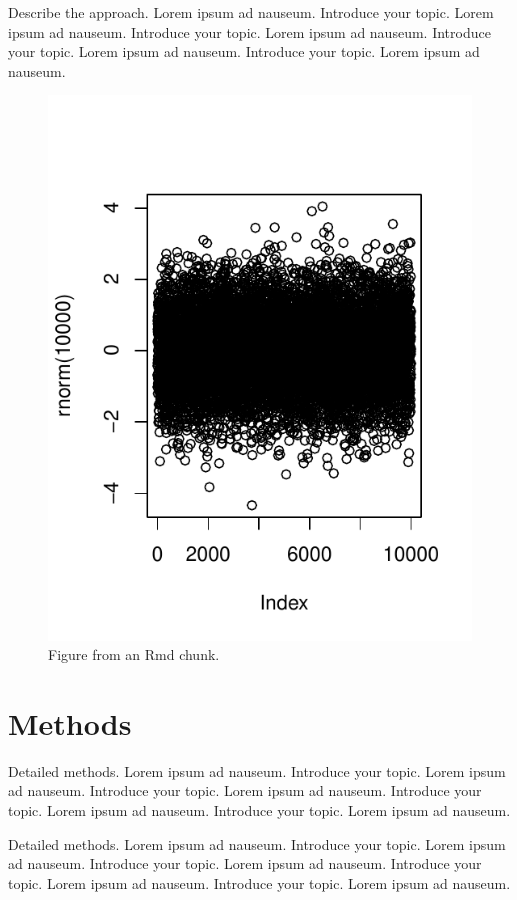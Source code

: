 \documentclass{bioinfo}
\begin{document}
Describe the approach. Lorem ipsum ad nauseum. Introduce your topic.
Lorem ipsum ad nauseum. Introduce your topic. Lorem ipsum ad nauseum.
Introduce your topic. Lorem ipsum ad nauseum. Introduce your topic.
Lorem ipsum ad nauseum.

\begin{figure}
\centering
\includegraphics{manuscript_files/figure-latex/figure-1.pdf}
\caption{Figure from an Rmd chunk.}
\end{figure}

\section{Methods}

Detailed methods. Lorem ipsum ad nauseum. Introduce your topic. Lorem
ipsum ad nauseum. Introduce your topic. Lorem ipsum ad nauseum.
Introduce your topic. Lorem ipsum ad nauseum. Introduce your topic.
Lorem ipsum ad nauseum.

Detailed methods. Lorem ipsum ad nauseum. Introduce your topic. Lorem
ipsum ad nauseum. Introduce your topic. Lorem ipsum ad nauseum.
Introduce your topic. Lorem ipsum ad nauseum. Introduce your topic.
Lorem ipsum ad nauseum.
\end{document}
